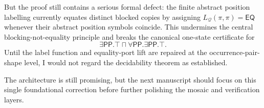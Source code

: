 \documentclass[11pt]{article}
\newcommand{\EQ}{\mathsf{EQ}}
\newcommand{\PP}{\mathsf{PP}}
\newcommand{\Q}{\mathcal Q}
\begin{document}
But the proof still contains a serious formal defect: the finite abstract
position labelling currently equates distinct blocked copies by assigning
$L_{\Q}(\pi,\pi)=\EQ$ whenever their abstract position symbols coincide.  This
undermines the central blocking-not-equality principle and breaks the canonical
one-state certificate for
\[
  \exists\PP.\top\sqcap\forall\PP.\exists\PP.\top.
\]
Until the label function and equality-port lift are repaired at the
occurrence-pair-shape level, I would not regard the decidability theorem as
established.

The architecture is still promising, but the next manuscript should focus on
this single foundational correction before further polishing the mosaic and
verification layers.
\end{document}
